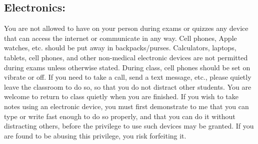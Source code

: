 \documentclass[margin]{res}
\theoremstyle{plain}
\theoremstyle{definition}
\theoremstyle{remark}
\newcounter{week}
\begin{document}
\begin{resume}


\section{Electronics: } You are not allowed to have on your person during exams or quizzes any device that can access the internet or communicate in any way.  Cell phones, Apple watches, etc. should be put away in backpacks/purses.  Calculators, laptops, tablets, cell phones, and other non-medical electronic devices are not permitted during exams unless otherwise stated.  During class, cell phones should be set on vibrate or off.  If you need to take a call, send a text message, etc., please quietly leave the classroom to do so, so that you do not distract other students.  You are welcome to return to class quietly when you are finished.  If you wish to take notes using an electronic device, you must first demonstrate to me that you can type or write fast enough to do so properly, and that you can do it without distracting others, before the privilege to use such devices may be granted.  If you are found to be abusing this privilege, you risk forfeiting it.


\end{resume}
\end{document}
